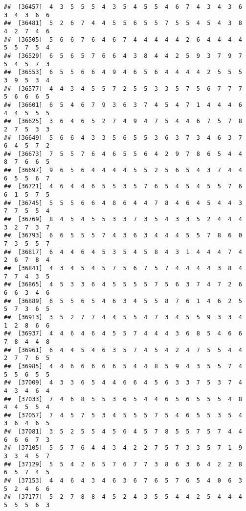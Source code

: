 \documentclass[
]{book}
\begin{document}
\begin{verbatim}
##  [36457]  4  3  5  5  5  4  3  5  4  5  5  4  6  7  4  3  4  3  6  3  4  3  6  6
##  [36481]  5  2  6  7  4  4  5  5  6  5  5  7  5  5  4  5  4  3  8  4  2  7  4  6
##  [36505]  5  6  6  7  6  4  6  7  4  4  4  4  4  2  6  4  4  4  4  5  5  7  5  4
##  [36529]  6  5  6  5  7  6  6  4  3  8  4  4  2  5  9  3  7  9  7  5  4  5  7  3
##  [36553]  6  5  5  6  6  4  9  4  6  5  6  4  4  4  4  2  5  5  5  3  9  5  3  4
##  [36577]  4  4  3  4  5  5  7  2  5  5  3  3  5  7  5  6  7  7  7  5  6  6  6  5
##  [36601]  6  5  4  6  7  9  3  6  3  7  4  5  4  7  1  4  4  4  6  4  4  5  5  5
##  [36625]  3  6  4  6  5  2  7  4  9  4  7  5  4  4  6  7  5  7  8  2  7  5  3  3
##  [36649]  5  6  6  4  3  3  5  6  5  5  3  6  3  7  3  4  6  3  7  6  4  5  7  2
##  [36673]  7  5  5  7  6  4  6  5  5  6  4  2  9  7  8  6  5  4  4  8  7  6  6  5
##  [36697]  9  6  5  6  4  4  4  4  5  5  2  5  6  5  4  3  7  4  4  6  5  5  6  7
##  [36721]  4  6  4  4  6  5  5  3  5  7  6  5  4  5  4  5  5  7  6  6  1  5  7  5
##  [36745]  5  5  5  6  6  4  8  6  4  4  7  8  4  6  4  5  4  4  3  7  7  5  5  4
##  [36769]  8  4  5  4  5  5  3  3  7  3  5  4  3  3  5  2  4  4  4  3  2  7  3  7
##  [36793]  6  6  5  5  5  7  4  3  6  3  4  4  4  5  5  7  8  6  0  7  3  5  5  7
##  [36817]  6  4  4  6  4  5  3  5  4  5  8  4  3  1  4  4  4  7  4  2  6  7  8  4
##  [36841]  4  3  4  5  4  5  7  5  6  7  5  7  4  4  4  4  3  8  4  7  7  4  3  5
##  [36865]  4  5  3  3  6  4  5  5  5  5  7  5  6  3  7  4  7  2  6  6  6  3  4  6
##  [36889]  6  5  5  6  5  4  6  3  4  5  5  8  7  6  1  4  6  2  5  5  7  3  6  5
##  [36913]  3  5  2  7  7  4  4  5  5  4  7  3  4  5  5  9  3  3  4  1  2  8  6  6
##  [36937]  4  4  6  4  6  4  5  5  7  4  4  4  3  6  8  5  4  6  6  7  8  4  4  8
##  [36961]  6  4  4  5  4  6  3  5  7  4  5  4  2  4  7  5  5  4  4  2  7  7  6  5
##  [36985]  4  4  6  6  6  6  6  5  4  4  8  5  9  4  3  5  5  7  4  5  5  6  5  5
##  [37009]  4  3  3  6  5  4  4  6  6  4  5  6  3  3  7  5  3  7  4  4  3  4  6  4
##  [37033]  7  4  6  8  5  5  3  6  5  4  4  6  5  6  5  5  5  4  8  4  4  5  5  4
##  [37057]  7  4  5  7  5  3  4  5  5  5  7  5  4  6  5  5  3  5  4  3  6  4  6  5
##  [37081]  3  5  2  5  5  4  5  6  4  5  7  8  5  5  7  5  7  4  4  6  6  6  7  3
##  [37105]  5  5  7  6  4  4  3  4  2  2  7  5  7  3  3  5  7  1  9  3  3  4  5  7
##  [37129]  5  5  4  2  6  5  7  6  7  7  3  8  6  3  6  4  2  2  8  6  5  7  4  5
##  [37153]  4  4  6  4  3  4  6  3  6  7  6  5  7  6  5  4  0  6  3  5  2  4  6  6
##  [37177]  5  2  7  8  8  4  5  2  4  3  5  5  4  4  2  5  4  4  4  5  5  5  6  3

\end{verbatim}
\end{document}
